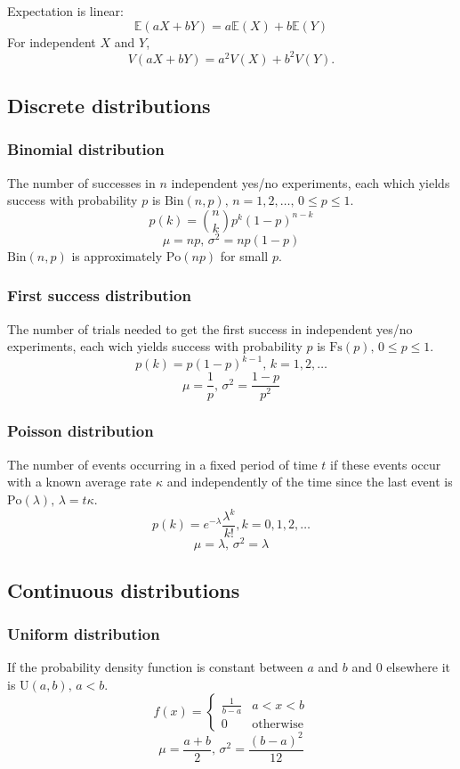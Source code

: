 Expectation is linear:
\[\mathbb{E}(aX+bY) = a\mathbb{E}(X)+b\mathbb{E}(Y)\]
For independent $X$ and $Y$, \[V(aX+bY) = a^2V(X)+b^2V(Y).\]

\subsection{Discrete distributions}

\subsubsection{Binomial distribution}
The number of successes in $n$ independent yes/no experiments, each which yields success with probability $p$ is $\textrm{Bin}(n,p),\,n=1,2,\dots,\, 0\leq p\leq1$.
\[p(k)=\binom{n}{k}p^k(1-p)^{n-k}\]
\[\mu = np,\,\sigma^2=np(1-p)\]
$\textrm{Bin}(n,p)$ is approximately $\textrm{Po}(np)$ for small $p$.

\subsubsection{First success distribution}
The number of trials needed to get the first success in independent yes/no experiments, each wich yields success with probability $p$ is $\textrm{Fs}(p),\,0\leq p\leq1$.
\[p(k)=p(1-p)^{k-1},\,k=1,2,\dots\]
\[\mu = \frac1p,\,\sigma^2=\frac{1-p}{p^2}\]

\subsubsection{Poisson distribution}
The number of events occurring in a fixed period of time $t$ if these events occur with a known average rate $\kappa$ and independently of the time since the last event is $\textrm{Po}(\lambda),\,\lambda=t\kappa$.
\[p(k)=e^{-\lambda}\frac{\lambda^k}{k!}, k=0,1,2,\dots\]
\[\mu=\lambda,\,\sigma^2=\lambda\]

\subsection{Continuous distributions}

\subsubsection{Uniform distribution}
If the probability density function is constant between $a$ and $b$ and 0 elsewhere it is $\textrm{U}(a,b),\,a<b$.
\[f(x) = \left\{
\begin{array}{cl}
\frac{1}{b-a} & a<x<b\\
0 & \textrm{otherwise}
\end{array}\right.\]
\[\mu=\frac{a+b}{2},\,\sigma^2=\frac{(b-a)^2}{12}\]

